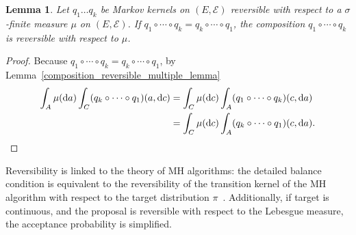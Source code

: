 \documentclass[english,twoside,openright]{HYgraduMLDS}
\newtheorem{lemma}{Lemma}
\newcommand{\dx}{\mathrm{d}}
\begin{document}
\begin{lemma}\label{composition_reversible_symmetric_lemma}
  Let \(q_{1}\dotsc q_{k}\) be Markov kernels on \((E, \mathcal{E})\) reversible
  with respect to a \(\sigma\)-finite measure \(\mu\) on \((E, \mathcal{E})\).
  If \(q_{1}\circ \dotsb \circ q_{k} = q_{k}\circ \dotsb \circ q_{1}\),
  the composition \(q_{1}\circ \dotsb \circ q_{k}\) is reversible with
  respect to \(\mu\).
\end{lemma}
\begin{proof}
  Because \(q_{1}\circ \dotsb \circ q_{k} = q_{k}\circ \dotsb \circ q_{1}\),
  by Lemma~\ref{composition_reversible_multiple_lemma}
  \begin{align*}
    \int_{A}\mu(\dx a)\int_{C}(q_{k}\circ \dotsb \circ q_{1})(a, \dx c)
    &= \int_{C}\mu(\dx c)\int_{A}(q_{1}\circ \dotsb \circ q_{k})(c, \dx a)
    \\&= \int_{C}\mu(\dx c)\int_{A}(q_{k}\circ \dotsb \circ q_{1})(c, \dx a).
    \qedhere
  \end{align*}
\end{proof}

Reversibility is linked to the theory of MH algorithms: the detailed balance
condition is equivalent to the reversibility of the transition kernel of
the MH algorithm with respect to the target distribution \(\pi\)~\cite{Tie98}.
Additionally, if target is continuous, and the proposal is reversible with
respect to the Lebesgue measure, the acceptance probability is simplified.
\end{document}
